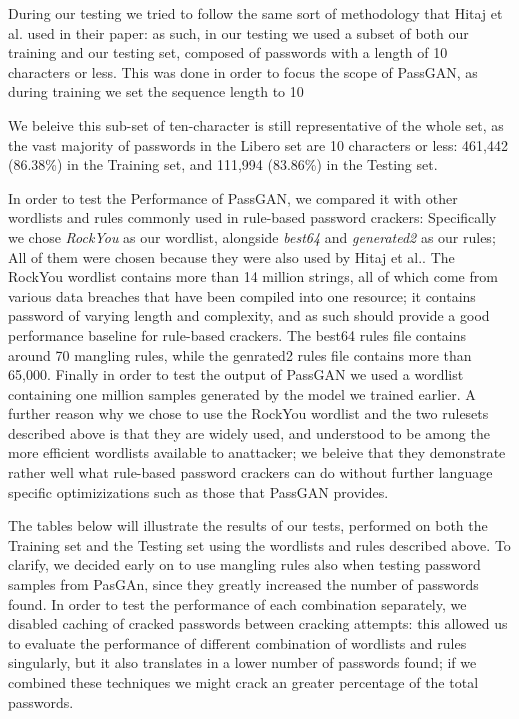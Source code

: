 During our testing we tried to follow the same sort of methodology that Hitaj et al.\cite{PassGAN} used in their paper: as such, in our testing we used a subset of both our training  and our testing set, composed of passwords with a length of 10 characters or less. This was done in order to focus the scope of PassGAN, as during training we set the sequence length to 10 %

We beleive this sub-set of ten-character is still representative of the whole set, as the vast majority of passwords in the Libero set are 10 characters or less: 461,442 (86.38\%) in the Training set, and 111,994 (83.86\%) in the Testing set. 

In order to test the Performance of PassGAN, we compared it with other wordlists and rules commonly used in rule-based password crackers: Specifically we chose \emph{RockYou} as our wordlist, alongside \emph{best64} and \emph{generated2} as our rules; All of them were chosen because they were also used by Hitaj et al.\cite{PassGAN}.
The RockYou wordlist contains more than 14 million strings, all of which come from various data breaches that have been compiled into one resource; it contains password of varying length and complexity, and as such should provide a good performance baseline for rule-based crackers. The best64 rules file contains around 70 mangling rules, while the genrated2 rules file contains more than 65,000. 
Finally in order to test the output of PassGAN we used a wordlist containing one million samples generated by the model we trained earlier.
A further reason why we chose to use the RockYou wordlist and the two rulesets described above is that they are widely used, and understood to be among the more efficient wordlists available to anattacker; we beleive that they demonstrate rather well what rule-based password crackers can do without further language specific optimizizations such as those that PassGAN provides.

The tables below will illustrate the results of our tests, performed on both the Training set and the Testing set using the wordlists and rules described above. To clarify, we decided early on to use mangling rules also when testing password samples from PasGAn, since they greatly increased the number of passwords found. In order to test the performance of each combination separately, we disabled caching of cracked passwords between cracking attempts: this allowed us to evaluate the performance of different combination of wordlists and rules singularly, but it also translates in a lower number of passwords found; if we combined these techniques we might crack an greater percentage of the total passwords. %

